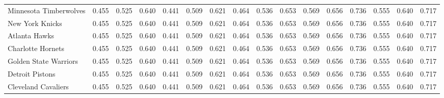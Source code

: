 \documentclass[11pt,a4paper]{article}
\begin{document}
\begin{table}[H]
\begin{tabular}{l ccc ccc ccc ccc ccc}
Minnesota Timberwolves & 0.455 & 0.525 & 0.640 & 0.441 & 0.509 & 0.621 & 0.464 & 0.536 & 0.653 & 0.569 & 0.656 & 0.736 & 0.555 & 0.640 & 0.717 \\
New York Knicks & 0.455 & 0.525 & 0.640 & 0.441 & 0.509 & 0.621 & 0.464 & 0.536 & 0.653 & 0.569 & 0.656 & 0.736 & 0.555 & 0.640 & 0.717 \\
Atlanta Hawks & 0.455 & 0.525 & 0.640 & 0.441 & 0.509 & 0.621 & 0.464 & 0.536 & 0.653 & 0.569 & 0.656 & 0.736 & 0.555 & 0.640 & 0.717 \\
Charlotte Hornets & 0.455 & 0.525 & 0.640 & 0.441 & 0.509 & 0.621 & 0.464 & 0.536 & 0.653 & 0.569 & 0.656 & 0.736 & 0.555 & 0.640 & 0.717 \\
Golden State Warriors & 0.455 & 0.525 & 0.640 & 0.441 & 0.509 & 0.621 & 0.464 & 0.536 & 0.653 & 0.569 & 0.656 & 0.736 & 0.555 & 0.640 & 0.717 \\
Detroit Pistons & 0.455 & 0.525 & 0.640 & 0.441 & 0.509 & 0.621 & 0.464 & 0.536 & 0.653 & 0.569 & 0.656 & 0.736 & 0.555 & 0.640 & 0.717 \\
Cleveland Cavaliers & 0.455 & 0.525 & 0.640 & 0.441 & 0.509 & 0.621 & 0.464 & 0.536 & 0.653 & 0.569 & 0.656 & 0.736 & 0.555 & 0.640 & 0.717 \\
\bottomrule
\end{tabular}
\end{table}
\end{document}
